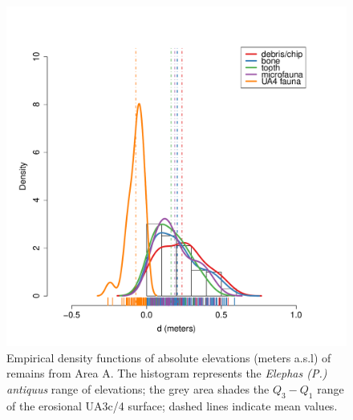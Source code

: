 \documentclass[preprint,authoryear,times]{elsarticle} %
\begin{document}
\begin{figure}[]
  \centering
  \includegraphics[width=1\textwidth]{../artwork/Fig9.pdf}
  \caption{Empirical density functions of absolute elevations (meters a.s.l) of remains from Area A. The histogram represents the \emph{Elephas (P.) antiquus} range of elevations; the grey area shades the $Q_3-Q_1$ range of the erosional UA3c/4 surface; dashed lines indicate mean values.}
  \label{fig:9}
\end{figure}

\end{document}

